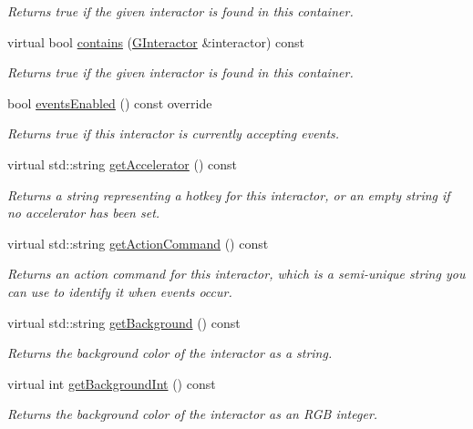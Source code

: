 \begin{DoxyCompactItemize}
\begin{DoxyCompactList}\small\item\em Returns true if the given interactor is found in this container. \end{DoxyCompactList}\item 
virtual bool \mbox{\hyperlink{classGContainer_a62fe1c67f06f657fea8b9b28672516a0}{contains}} (\mbox{\hyperlink{classGInteractor}{G\+Interactor}} \&interactor) const
\begin{DoxyCompactList}\small\item\em Returns true if the given interactor is found in this container. \end{DoxyCompactList}\item 
bool \mbox{\hyperlink{classGInteractor_a597a370b592e3737d38d9d2f4e2031ea}{events\+Enabled}} () const override
\begin{DoxyCompactList}\small\item\em Returns true if this interactor is currently accepting events. \end{DoxyCompactList}\item 
virtual std\+::string \mbox{\hyperlink{classGInteractor_a69f8d23ed8f207fbecad99960776e942}{get\+Accelerator}} () const
\begin{DoxyCompactList}\small\item\em Returns a string representing a hotkey for this interactor, or an empty string if no accelerator has been set. \end{DoxyCompactList}\item 
virtual std\+::string \mbox{\hyperlink{classGInteractor_a94eb4276000c4fdfb508ce9e6317a82a}{get\+Action\+Command}} () const
\begin{DoxyCompactList}\small\item\em Returns an action command for this interactor, which is a semi-\/unique string you can use to identify it when events occur. \end{DoxyCompactList}\item 
virtual std\+::string \mbox{\hyperlink{classGInteractor_a808e22cc1fdfbecf71ed8c64ef4600e0}{get\+Background}} () const
\begin{DoxyCompactList}\small\item\em Returns the background color of the interactor as a string. \end{DoxyCompactList}\item 
virtual int \mbox{\hyperlink{classGInteractor_a9e827257a55cb8cf4d9de2ec6bcfd7a0}{get\+Background\+Int}} () const
\begin{DoxyCompactList}\small\item\em Returns the background color of the interactor as an R\+GB integer. \end{DoxyCompactList}\item 

\end{DoxyCompactItemize}
